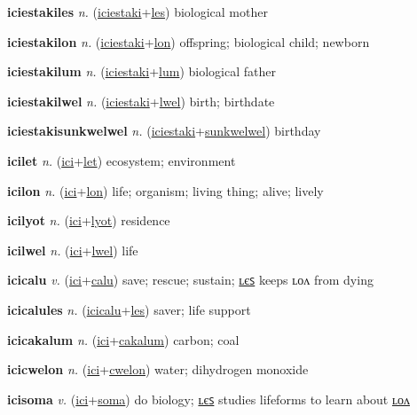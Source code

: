 \textbf{\hypertarget{iciestakiles}{iciestakiles}} \textit{n.} (\hyperlink{iciestaki}{iciestaki}+\allowbreak \hyperlink{les}{les})
biological mother

\textbf{\hypertarget{iciestakilon}{iciestakilon}} \textit{n.} (\hyperlink{iciestaki}{iciestaki}+\allowbreak \hyperlink{lon}{lon})
offspring; biological child; newborn

\textbf{\hypertarget{iciestakilum}{iciestakilum}} \textit{n.} (\hyperlink{iciestaki}{iciestaki}+\allowbreak \hyperlink{lum}{lum})
biological father

\textbf{\hypertarget{iciestakilwel}{iciestakilwel}} \textit{n.} (\hyperlink{iciestaki}{iciestaki}+\allowbreak \hyperlink{lwel}{lwel})
birth; birthdate

\textbf{\hypertarget{iciestakisunkwelwel}{iciestakisunkwelwel}} \textit{n.} (\hyperlink{iciestaki}{iciestaki}+\allowbreak \hyperlink{sunkwelwel}{sunkwelwel})
birthday

\textbf{\hypertarget{icilet}{icilet}} \textit{n.} (\hyperlink{ici}{ici}+\allowbreak \hyperlink{let}{let})
ecosystem; environment

\textbf{\hypertarget{icilon}{icilon}} \textit{n.} (\hyperlink{ici}{ici}+\allowbreak \hyperlink{lon}{lon})
life; organism; living thing; alive; lively

\textbf{\hypertarget{icilyot}{icilyot}} \textit{n.} (\hyperlink{ici}{ici}+\allowbreak \hyperlink{lyot}{lyot})
residence

\textbf{\hypertarget{icilwel}{icilwel}} \textit{n.} (\hyperlink{ici}{ici}+\allowbreak \hyperlink{lwel}{lwel})
life

\textbf{\hypertarget{icicalu}{icicalu}} \textit{v.} (\hyperlink{ici}{ici}+\allowbreak \hyperlink{calu}{calu})
save; rescue; sustain; \hyperlink{icicalules}{ʟєꜱ} keeps ʟᴏᴧ from dying

\textbf{\hypertarget{icicalules}{icicalules}} \textit{n.} (\hyperlink{icicalu}{icicalu}+\allowbreak \hyperlink{les}{les})
saver; life support

\textbf{\hypertarget{icicakalum}{icicakalum}} \textit{n.} (\hyperlink{ici}{ici}+\allowbreak \hyperlink{cakalum}{cakalum})
carbon; coal

\textbf{\hypertarget{icicwelon}{icicwelon}} \textit{n.} (\hyperlink{ici}{ici}+\allowbreak \hyperlink{cwelon}{cwelon})
water; dihydrogen monoxide

\textbf{\hypertarget{icisoma}{icisoma}} \textit{v.} (\hyperlink{ici}{ici}+\allowbreak \hyperlink{soma}{soma})
do biology; \hyperlink{icisomales}{ʟєꜱ} studies lifeforms to learn about \hyperlink{icisomalon}{ʟᴏᴧ}

